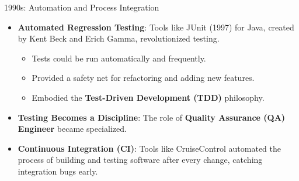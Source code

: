 \documentclass{beamer}
\begin{document}
\begin{frame}[t]{1990s: Automation and Process Integration}
\begin{itemize}
    \item \textbf{Automated Regression Testing}: Tools like JUnit (1997) for Java, created by Kent Beck and Erich Gamma, revolutionized testing.
    \begin{itemize}
        \item Tests could be run automatically and frequently.
        \item Provided a safety net for refactoring and adding new features.
        \item Embodied the \textbf{Test-Driven Development (TDD)} philosophy.
    \end{itemize}
    \item \textbf{Testing Becomes a Discipline}: The role of \textbf{Quality Assurance (QA) Engineer} became specialized.
    \item \textbf{Continuous Integration (CI)}: Tools like CruiseControl automated the process of building and testing software after every change, catching integration bugs early.
\end{itemize}
\begin{center}
\end{center}
\end{frame}
\end{document}
